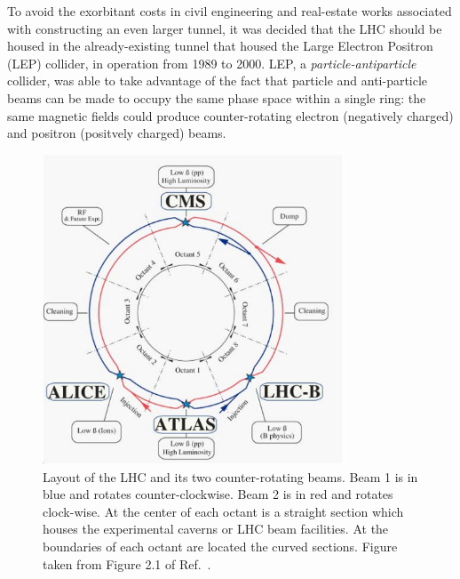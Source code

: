 
To avoid the exorbitant costs in civil engineering and real-estate works associated with
constructing an even larger tunnel, it was decided that the LHC should be housed in the already-existing
tunnel that housed the Large Electron Positron (LEP) collider, in operation from 1989 to 2000.
LEP, a \textit{particle-antiparticle} collider, was able to take advantage of the fact that
 particle and anti-particle beams can be made to occupy the same phase space within a single ring: the same magnetic
fields could produce counter-rotating electron (negatively charged) and positron (positvely charged) beams.



\begin{figure}[!htb]
    \begin{center}
        \includegraphics[width=0.8\textwidth]{figures/chapter2/lhc_layout}
        \caption{
            Layout of the LHC and its two counter-rotating beams. Beam 1 is in blue and rotates
            counter-clockwise. Beam 2 is in red and rotates clock-wise.
            At the center of each octant is a straight section which houses
            the experimental caverns or LHC beam facilities.
            At the boundaries of each octant are located the curved sections.
            Figure taken from Figure 2.1 of Ref.~\cite{Evans_2008}.
        }
        \label{fig:lhc_layout}
    \end{center}
\end{figure}


